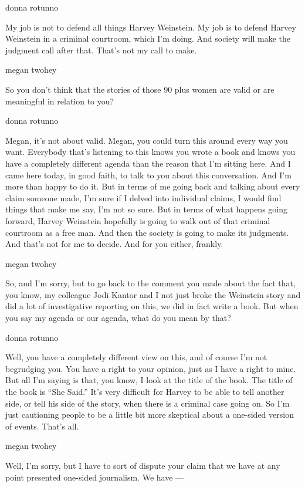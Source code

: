 donna rotunno

My job is not to defend all things Harvey Weinstein. My job is to defend
Harvey Weinstein in a criminal courtroom, which I'm doing. And society
will make the judgment call after that. That's not my call to make.

megan twohey

So you don't think that the stories of those 90 plus women are valid or
are meaningful in relation to you?

donna rotunno

Megan, it's not about valid. Megan, you could turn this around every way
you want. Everybody that's listening to this knows you wrote a book and
knows you have a completely different agenda than the reason that I'm
sitting here. And I came here today, in good faith, to talk to you about
this conversation. And I'm more than happy to do it. But in terms of me
going back and talking about every claim someone made, I'm sure if I
delved into individual claims, I would find things that make me say, I'm
not so sure. But in terms of what happens going forward, Harvey
Weinstein hopefully is going to walk out of that criminal courtroom as a
free man. And then the society is going to make its judgments. And
that's not for me to decide. And for you either, frankly.

megan twohey

So, and I'm sorry, but to go back to the comment you made about the fact
that, you know, my colleague Jodi Kantor and I not just broke the
Weinstein story and did a lot of investigative reporting on this, we did
in fact write a book. But when you say my agenda or our agenda, what do
you mean by that?

donna rotunno

Well, you have a completely different view on this, and of course I'm
not begrudging you. You have a right to your opinion, just as I have a
right to mine. But all I'm saying is that, you know, I look at the title
of the book. The title of the book is ``She Said.'' It's very difficult
for Harvey to be able to tell another side, or tell his side of the
story, when there is a criminal case going on. So I'm just cautioning
people to be a little bit more skeptical about a one-sided version of
events. That's all.

megan twohey

Well, I'm sorry, but I have to sort of dispute your claim that we have
at any point presented one-sided journalism. We have ---

